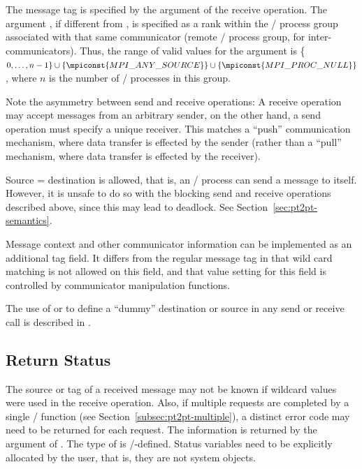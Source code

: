 The message tag is specified by the  argument of the
receive operation.
The argument , if different from ,
is specified as a rank within the \MPI/ process group associated
with that same communicator (remote \MPI/ process group, for inter-communicators).
Thus, the range of valid values for the
 argument is
\{$0,\ldots,n-1\}\cup\{\mpiconst{MPI\_ANY\_SOURCE}\}\cup\{\mpiconst{MPI\_PROC\_NULL}\}$, where
$n$ is the number of \MPI/ processes in this group.

Note the asymmetry between send and receive operations: A receive
operation may
accept messages from an arbitrary sender, on the other hand, a send operation
must specify a unique receiver.  This matches a ``push'' communication
mechanism, where data transfer is effected by the sender (rather than a
``pull'' mechanism, where data transfer is effected by the receiver).

Source = destination is allowed, that is, an \MPI/ process can send a
message to itself.
However, it is unsafe to do so with the blocking send and receive
operations described above, since this may lead to deadlock. See
Section~\ref{sec:pt2pt-semantics}.

\begin{implementors}
Message context and other communicator information
can be implemented as an additional tag field.  It differs
from the regular message tag in that wild card matching is not allowed on this
field, and that value setting for this field is controlled by communicator
manipulation functions.
\end{implementors}

The use of \mpicode{ = } or \mpicode{ = } to define a ``dummy''
destination or source in any send or receive call is described in
.

\subsection{Return Status}
\label{subsec:pt2pt-status}

The source or tag of a received message may not be known if wildcard
values were used in the receive operation.
Also, if multiple requests
are completed by a single \MPI/ function (see
Section~\ref{subsec:pt2pt-multiple}), a distinct error code may need to be
returned for each request.
The information is returned by the 
argument of .  The type of  is
\MPI/-defined.
Status variables need to be explicitly
allocated by the user, that is, they are not system objects.


